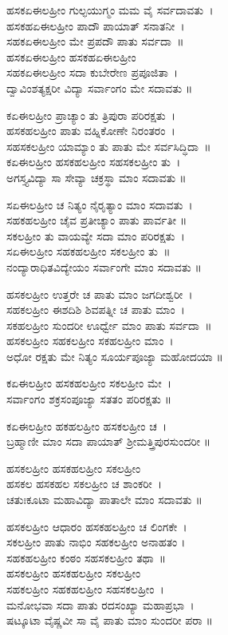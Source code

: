 ಹಸಕಏಈಲಹ್ರೀಂ ಗುಲ್ಫಯುಗ್ಮಂ ಮಮ ವೈ ಸರ್ವದಾವತು~।\\
ಹಸಕಹಏಈಲಹ್ರೀಂ ಪಾದೌ ಪಾಯಾತ್ ಸನಾತನೀ~।\\
ಸಹಕಏಈಲಹ್ರೀಂ ಮೇ ಪ್ರಪದೌ ಪಾತು ಸರ್ವದಾ~॥\\
ಹಸಕಏಈಲಹ್ರೀಂ ಹಸಕಹಏಈಲಹ್ರೀಂ\\
ಸಹಕಏಈಲಹ್ರೀಂ ಸದಾ ಕುಬೇರೇಣ ಪ್ರಪೂಜಿತಾ~।\\
ದ್ವಾವಿಂಶತ್ಯಕ್ಷರೀ ವಿದ್ಯಾ ಸರ್ವಾಂಗಂ ಮೇ ಸದಾವತು ॥

ಕಏಈಲಹ್ರೀಂ ಪ್ರಾಚ್ಯಾಂ ತು ತ್ರಿಪುರಾ ಪರಿರಕ್ಷತು~।\\
ಹಸಕಹಲಹ್ರೀಂ ಪಾತು ವಹ್ನಿಕೋಣೇ ನಿರಂತರಂ~।\\
ಸಹಸಕಲಹ್ರೀಂ ಯಾಮ್ಯಾಂ ತು ಪಾತು ಮೇ ಸರ್ವಸಿದ್ಧಿದಾ~॥\\
ಕಏಈಲಹ್ರೀಂ ಹಸಕಹಲಹ್ರೀಂ ಸಹಸಕಲಹ್ರೀಂ ತು~।\\
ಅಗಸ್ತ್ಯವಿದ್ಯಾ ಸಾ ಸೇವ್ಯಾ ಚಕ್ರಸ್ಥಾ ಮಾಂ ಸದಾವತು ॥

ಸಏಈಲಹ್ರೀಂ ಚ ನಿತ್ಯಂ ನೈರೃತ್ಯಾಂ ಮಾಂ ಸದಾವತು~।\\
ಸಹಕಹಲಹ್ರೀಂ ಚೈವ ಪ್ರತೀಚ್ಯಾಂ ಪಾತು ಪಾರ್ವತೀ ॥\\
ಸಕಲಹ್ರೀಂ ತು ವಾಯವ್ಯೇ ಸದಾ ಮಾಂ ಪರಿರಕ್ಷತು~।\\
ಸಏಈಲಹ್ರೀಂ ಸಹಕಹಲಹ್ರೀಂ ಸಕಲಹ್ರೀಂ ತು~॥\\
ನಂದ್ಯಾರಾಧಿತವಿದ್ಯೇಯಂ ಸರ್ವಾಂಗೇ ಮಾಂ ಸದಾವತು ॥

ಹಸಕಲಹ್ರೀಂ ಉತ್ತರೇ ಚ ಪಾತು ಮಾಂ ಜಗದೀಶ್ವರೀ~।\\
ಸಹಕಲಹ್ರೀಂ ಈಶದಿಶಿ ಶಿವಪತ್ನೀ ಚ ಪಾತು ಮಾಂ~।\\
ಸಕಹಲಹ್ರೀಂ ಸುಂದರೀ ಊರ್ಧ್ವೇ ಮಾಂ ಪಾತು ಸರ್ವದಾ~॥\\
ಹಸಕಲಹ್ರೀಂ ಸಹಕಲಹ್ರೀಂ ಸಕಹಲಹ್ರೀಂ ಮಾಂ~।\\
ಅಧೋ ರಕ್ಷತು ಮೇ ನಿತ್ಯಂ ಸೂರ್ಯಪೂಜ್ಯಾ ಮಹೋದಯಾ ॥

ಕಏಈಲಹ್ರೀಂ ಹಸಕಹಲಹ್ರೀಂ ಸಕಲಹ್ರೀಂ ಮೇ~।\\
ಸರ್ವಾಂಗಂ ಶಕ್ರಸಂಪೂಜ್ಯಾ ಸತತಂ ಪರಿರಕ್ಷತು ॥

ಕಏಈಲಹ್ರೀಂ ಹಕಹಲಹ್ರೀಂ ಹಸಕಲಹ್ರೀಂ ಚ~।\\
ಬ್ರಹ್ಮಾಣೀ ಮಾಂ ಸದಾ ಪಾಯಾತ್ ಶ್ರೀಮತ್ತ್ರಿಪುರಸುಂದರೀ ॥

ಹಸಕಲಹ್ರೀಂ ಹಸಕಹಲಹ್ರೀಂ ಸಕಲಹ್ರೀಂ \\ಹಸಕಲ ಹಸಕಹಲ ಸಕಲಹ್ರೀಂ ಚ ಶಾಂಕರೀ~।\\
ಚತುಃಕೂಟಾ ಮಹಾವಿದ್ಯಾ ಪಾತಾಲೇ ಮಾಂ ಸದಾವತು ॥

ಹಸಕಲಹ್ರೀಂ ಆಧಾರಂ ಹಸಕಹಲಹ್ರೀಂ ಚ ಲಿಂಗಕೇ~।\\
ಸಕಲಹ್ರೀಂ ಪಾತು ನಾಭಿಂ ಸಹಕಲಹ್ರೀಂ ಅನಾಹತಂ ।\\
ಸಹಕಹಲಹ್ರೀಂ ಕಂಠಂ ಸಹಸಕಲಹ್ರೀಂ ತಥಾ~॥\\
ಹಸಕಲಹ್ರೀಂ ಹಸಕಹಲಹ್ರೀಂ ಸಕಲಹ್ರೀಂ \\ಸಹಕಲಹ್ರೀಂ ಸಹಕಹಲಹ್ರೀಂ ಸಹಸಕಲಹ್ರೀಂ~।\\
ಮನೋಭವಾ ಸದಾ ಪಾತು ರದಸಂಖ್ಯಾ ಮಹಾಪ್ರಭಾ~।\\
ಷಟ್ಕೂಟಾ ವೈಷ್ಣವೀ ಸಾ ವೈ ಪಾತು ಮಾಂ ಸುಂದರೀ ಪರಾ ॥

